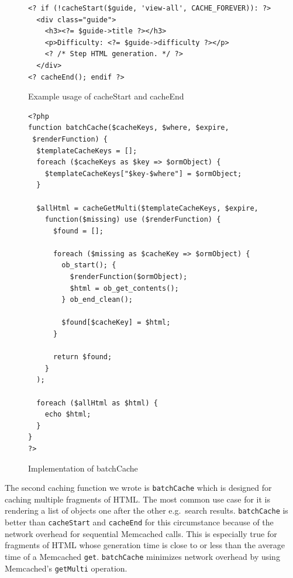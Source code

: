 \documentclass[12pt]{ucthesis}
\begin{document}
\begin{figure}[h]
\begin{ssp}
\begin{verbatim}
<? if (!cacheStart($guide, 'view-all', CACHE_FOREVER)): ?>
  <div class="guide">
    <h3><?= $guide->title ?></h3>
    <p>Difficulty: <?= $guide->difficulty ?></p>
    <? /* Step HTML generation. */ ?>
  </div>
<? cacheEnd(); endif ?>
\end{verbatim}
\caption{Example usage of cacheStart and cacheEnd}
\label{fig:cacheStartExample}
\end{ssp}
\end{figure}

\begin{figure}[hbtp]
\begin{ssp}
\begin{verbatim}
<?php
function batchCache($cacheKeys, $where, $expire,
 $renderFunction) {
  $templateCacheKeys = [];
  foreach ($cacheKeys as $key => $ormObject) {
    $templateCacheKeys["$key-$where"] = $ormObject;
  }

  $allHtml = cacheGetMulti($templateCacheKeys, $expire,
    function($missing) use ($renderFunction) {
      $found = [];

      foreach ($missing as $cacheKey => $ormObject) {
        ob_start(); {
          $renderFunction($ormObject);
          $html = ob_get_contents();
        } ob_end_clean();

        $found[$cacheKey] = $html;
      }

      return $found;
    }
  );

  foreach ($allHtml as $html) {
    echo $html;
  }
}
?>
\end{verbatim}
\caption{Implementation of batchCache}
\label{fig:batchCacheImplementation}
\end{ssp}
\end{figure}

The second caching function we wrote is {\tt batchCache} which is designed for caching multiple fragments of HTML\@.
The most common use case for it is rendering a list of objects one after the other e.g.\ search results.
{\tt batchCache} is better than {\tt cacheStart} and {\tt cacheEnd} for this circumstance because of the network overhead for sequential \textsf{Memcached} calls.
This is especially true for fragments of HTML whose generation time is close to or less than the average time of a \textsf{Memcached} {\tt get}.
{\tt batchCache} minimizes network overhead by using \textsf{Memcached}'s {\tt getMulti} operation.
\end{document}
